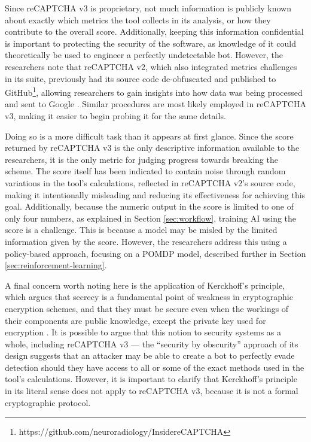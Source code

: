 \documentclass[sigplan,screen,nonacm]{acmart-tagged}
\begin{document}
Since reCAPTCHA v3 is proprietary, not much information is publicly known about exactly which metrics the tool collects in its analysis, or how they contribute to the overall score. Additionally, keeping this information confidential is important to protecting the security of the software, as knowledge of it could theoretically be used to engineer a perfectly undetectable bot. However, the researchers note that reCAPTCHA v2, which also integrated metrics challenges in its suite, previously had its source code de-obfuscated and published to GitHub\footnote{https://github.com/neuroradiology/InsidereCAPTCHA}, allowing researchers to gain insights into how data was being processed and sent to Google \cite{tsingen}. Similar procedures are most likely employed in reCAPTCHA v3, making it easier to begin probing it for the same details.

Doing so is a more difficult task than it appears at first glance. Since the score returned by reCAPTCHA v3 is the only descriptive information available to the researchers, it is the only metric for judging progress towards breaking the scheme. The score itself has been indicated to contain noise through random variations in the tool's calculations, reflected in reCAPTCHA v2's source code, making it intentionally misleading and reducing its effectiveness for achieving this goal. Additionally, because the numeric output in the score is limited to one of only four numbers, as explained in Section \ref{sec:workflow}, training AI using the score is a challenge. This is because a model may be misled by the limited information given by the score. However, the researchers address this using a policy-based approach, focusing on a POMDP model, described further in Section \ref{sec:reinforcement-learning}.

A final concern worth noting here is the application of Kerckhoff's principle, which argues that secrecy is a fundamental point of weakness in cryptographic encryption schemes, and that they must be secure even when the workings of their components are public knowledge, except the private key used for encryption \cite{kerckhoff}. It is possible to argue that this notion to security systems as a whole, including reCAPTCHA v3 --- the ``security by obscurity'' approach of its design suggests that an attacker may be able to create a bot to perfectly evade detection should they have access to all or some of the exact methods used in the tool's calculations. However, it is important to clarify that Kerckhoff's principle in its literal sense does not apply to reCAPTCHA v3, because it is not a formal cryptographic protocol. 
\end{document}
